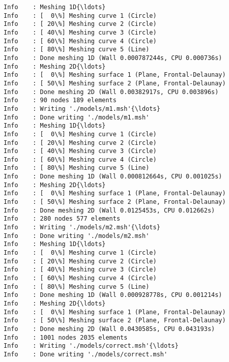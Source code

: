 \documentclass[11pt]{article}
\begin{document}
    \begin{Verbatim}[commandchars=\\\{\}]
Info    : Meshing 1D{\ldots}
Info    : [  0\%] Meshing curve 1 (Circle)
Info    : [ 20\%] Meshing curve 2 (Circle)
Info    : [ 40\%] Meshing curve 3 (Circle)
Info    : [ 60\%] Meshing curve 4 (Circle)
Info    : [ 80\%] Meshing curve 5 (Line)
Info    : Done meshing 1D (Wall 0.000787244s, CPU 0.000736s)
Info    : Meshing 2D{\ldots}
Info    : [  0\%] Meshing surface 1 (Plane, Frontal-Delaunay)
Info    : [ 50\%] Meshing surface 2 (Plane, Frontal-Delaunay)
Info    : Done meshing 2D (Wall 0.00382917s, CPU 0.003896s)
Info    : 90 nodes 189 elements
Info    : Writing './models/m1.msh'{\ldots}
Info    : Done writing './models/m1.msh'
Info    : Meshing 1D{\ldots}
Info    : [  0\%] Meshing curve 1 (Circle)
Info    : [ 20\%] Meshing curve 2 (Circle)
Info    : [ 40\%] Meshing curve 3 (Circle)
Info    : [ 60\%] Meshing curve 4 (Circle)
Info    : [ 80\%] Meshing curve 5 (Line)
Info    : Done meshing 1D (Wall 0.000812664s, CPU 0.001025s)
Info    : Meshing 2D{\ldots}
Info    : [  0\%] Meshing surface 1 (Plane, Frontal-Delaunay)
Info    : [ 50\%] Meshing surface 2 (Plane, Frontal-Delaunay)
Info    : Done meshing 2D (Wall 0.0125453s, CPU 0.012662s)
Info    : 280 nodes 577 elements
Info    : Writing './models/m2.msh'{\ldots}
Info    : Done writing './models/m2.msh'
Info    : Meshing 1D{\ldots}
Info    : [  0\%] Meshing curve 1 (Circle)
Info    : [ 20\%] Meshing curve 2 (Circle)
Info    : [ 40\%] Meshing curve 3 (Circle)
Info    : [ 60\%] Meshing curve 4 (Circle)
Info    : [ 80\%] Meshing curve 5 (Line)
Info    : Done meshing 1D (Wall 0.000928778s, CPU 0.001214s)
Info    : Meshing 2D{\ldots}
Info    : [  0\%] Meshing surface 1 (Plane, Frontal-Delaunay)
Info    : [ 50\%] Meshing surface 2 (Plane, Frontal-Delaunay)
Info    : Done meshing 2D (Wall 0.0430585s, CPU 0.043193s)
Info    : 1001 nodes 2035 elements
Info    : Writing './models/correct.msh'{\ldots}
Info    : Done writing './models/correct.msh'
    \end{Verbatim}
\end{document}
